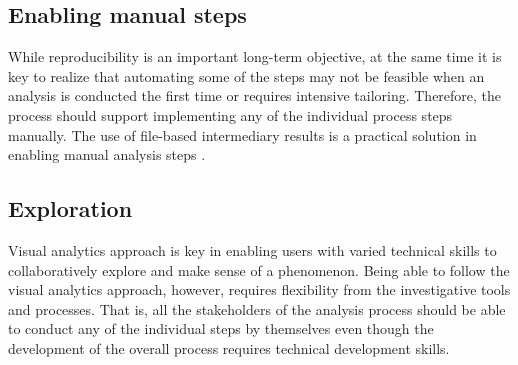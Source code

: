 



\subsection{Enabling manual steps}

While reproducibility is an important long-term objective, at the same time it is key to realize that automating some of the steps may not be feasible when an analysis is conducted the first time or requires intensive tailoring. Therefore, the process should support implementing any of the individual process steps manually. The use of file-based intermediary results is a practical solution in enabling manual analysis steps \citep[cf.][]{Huhtamaki2017ProcessingExperiences}.

\subsection{Exploration}

Visual analytics \citep{Heer2012InteractiveAnalysis} approach is key in enabling users with varied technical skills to collaboratively explore and make sense of a phenomenon. Being able to follow the visual analytics approach, however, requires flexibility from the investigative tools and processes. That is, all the stakeholders of the analysis process should be able to conduct any of the individual steps by themselves even though the development of the overall process requires technical development skills.

